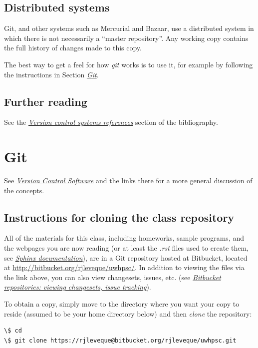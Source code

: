 \documentclass[letterpaper,10pt,english]{sphinxmanual}
\begin{document}
\subsection{Distributed systems}
\label{versioncontrol:distributed-systems}
Git, and other systems such as Mercurial and Bazaar, use a distributed
system in which there is not necessarily a ``master repository''.  Any working
copy contains the full history of changes made to this copy.

The best way to get a feel for how \emph{git} works is to use it, for example
by following the instructions in Section {\hyperref[git:git]{\emph{Git}}}.


\subsection{Further reading}
\label{versioncontrol:further-reading}
See the {\hyperref[biblio:biblio-vcs]{\emph{Version control systems references}}} section of the bibliography.


\section{Git}
\label{git:git}\label{git::doc}\label{git:id1}
See {\hyperref[versioncontrol:versioncontrol]{\emph{Version Control Software}}} and the links there
for a more general discussion of the concepts.


\subsection{Instructions for cloning the class repository}
\label{git:classgit}\label{git:instructions-for-cloning-the-class-repository}
All of the materials for this class, including homeworks, sample programs,
and the webpages you are now
reading (or at least the \emph{.rst} files used to create them, see
{\hyperref[sphinx:sphinx]{\emph{Sphinx documentation}}}), are in a Git repository hosted at Bitbucket, located
at
\href{http://bitbucket.org/rjleveque/uwhpsc/}{http://bitbucket.org/rjleveque/uwhpsc/}.
In addition to viewing the files via the link above, you can also view
changesets, issues, etc. (see {\hyperref[bitbucket:bitbucket]{\emph{Bitbucket repositories: viewing changesets, issue tracking}}}).

To obtain a copy, simply move to the directory where you want your copy to
reside (assumed to be your home directory below)
and then \emph{clone} the repository:

\begin{Verbatim}[commandchars=\\\{\}]
\$ cd
\$ git clone https://rjleveque@bitbucket.org/rjleveque/uwhpsc.git
\end{Verbatim}
\end{document}
